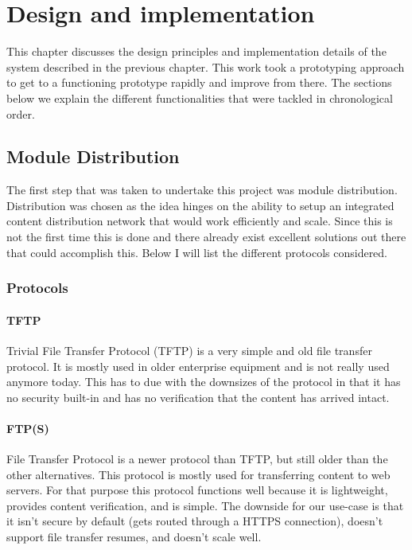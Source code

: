 \chapter{Design and implementation}


This chapter discusses the design principles and implementation details of the system described in the previous chapter. This work took a prototyping approach to get to a functioning prototype rapidly and improve from there. The sections below we explain the different functionalities that were tackled in chronological order.

\section{Module Distribution}

The first step that was taken to undertake this project was module distribution. Distribution was chosen as the idea hinges on the ability to setup an integrated content distribution network that would work efficiently and scale. Since this is not the first time this is done and there already exist excellent solutions out there that could accomplish this. Below I will list the different protocols considered.

\subsection{Protocols}
\subsubsection{\textbf{TFTP}}
Trivial File Transfer Protocol (TFTP) is a very simple and old file transfer protocol. It is mostly used in older enterprise equipment and is not really used anymore today. This has to due with the downsizes of the protocol in that it has no security built-in and has no verification that the content has arrived intact.

\subsubsection{\textbf{FTP(S)}}
File Transfer Protocol is a newer protocol than TFTP, but still older than the other alternatives. This protocol is mostly used for transferring content to web servers. For that purpose this protocol functions well because it is lightweight, provides content verification, and is simple. The downside for our use-case is that it isn't secure by default (gets routed through a HTTPS connection), doesn't support file transfer resumes, and doesn't scale well.


